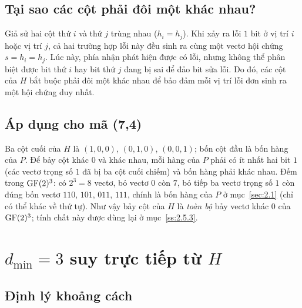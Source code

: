 \subsection{Tại sao các cột phải đôi một khác nhau?}
\label{ss:2.3.2}

Giả sử hai cột thứ $i$ và thứ $j$ trùng nhau ($h_i = h_j$). Khi xảy ra lỗi $1$
bit ở vị trí $i$ hoặc vị trí $j$, cả hai trường hợp lỗi này đều sinh ra cùng một
vectơ hội chứng $s = h_i = h_j$. Lúc này, phía nhận phát hiện được có lỗi, nhưng
không thể phân biệt được bit thứ $i$ hay bit thứ $j$ đang bị sai để đảo bit
sửa lỗi. Do đó, các cột của $H$ bắt buộc phải đôi một khác nhau để bảo đảm mỗi
vị trí lỗi đơn sinh ra một hội chứng duy nhất.

\subsection{Áp dụng cho mã (7,4)}
\label{ss:2.3.3}

Ba cột cuối của $H$ là $(1,0,0)$, $(0,1,0)$, $(0,0,1)$; bốn cột đầu là bốn hàng
của $P$. Để bảy cột khác $0$ và khác nhau, mỗi hàng của $P$ phải có ít nhất hai
bit $1$ (các vectơ trọng số $1$ đã bị ba cột cuối chiếm) và bốn hàng phải khác
nhau. Đếm trong $\mathrm{GF}(2)^{3}$: có $2^3 = 8$ vectơ, bỏ vectơ $0$ còn $7$, bỏ tiếp
ba vectơ trọng số $1$ còn đúng bốn vectơ $110$, $101$, $011$, $111$, chính là
bốn hàng của $P$ ở mục~\ref{sec:2.1} (chỉ có thể khác về thứ tự). Như vậy bảy
cột của $H$ là \emph{toàn bộ} bảy vectơ khác $0$ của $\mathrm{GF}(2)^{3}$; tính chất này
được dùng lại ở mục~\ref{ss:2.5.3}.

\section{\texorpdfstring{$d_{\min} = 3$}{dmin = 3} suy trực tiếp từ \texorpdfstring{$H$}{H}}
\label{sec:2.4}

\subsection{Định lý khoảng cách}
\label{ss:2.4.1}

